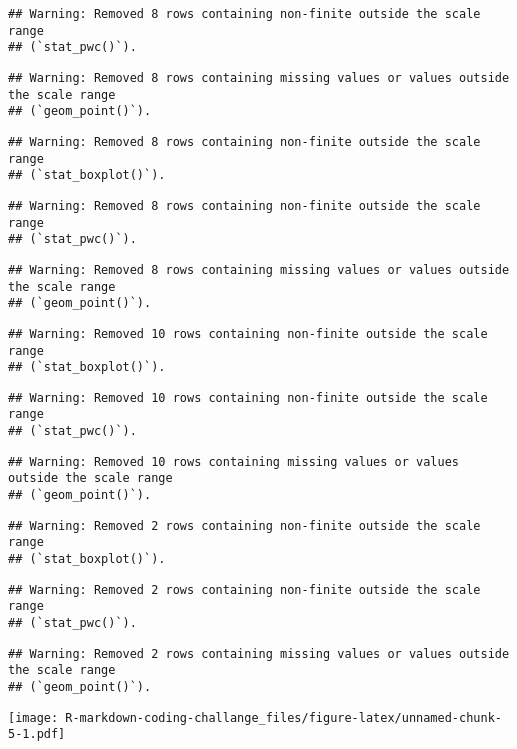 \documentclass[
]{article}
\begin{document}
\begin{verbatim}
## Warning: Removed 8 rows containing non-finite outside the scale range
## (`stat_pwc()`).
\end{verbatim}

\begin{verbatim}
## Warning: Removed 8 rows containing missing values or values outside the scale range
## (`geom_point()`).
\end{verbatim}

\begin{verbatim}
## Warning: Removed 8 rows containing non-finite outside the scale range
## (`stat_boxplot()`).
\end{verbatim}

\begin{verbatim}
## Warning: Removed 8 rows containing non-finite outside the scale range
## (`stat_pwc()`).
\end{verbatim}

\begin{verbatim}
## Warning: Removed 8 rows containing missing values or values outside the scale range
## (`geom_point()`).
\end{verbatim}

\begin{verbatim}
## Warning: Removed 10 rows containing non-finite outside the scale range
## (`stat_boxplot()`).
\end{verbatim}

\begin{verbatim}
## Warning: Removed 10 rows containing non-finite outside the scale range
## (`stat_pwc()`).
\end{verbatim}

\begin{verbatim}
## Warning: Removed 10 rows containing missing values or values outside the scale range
## (`geom_point()`).
\end{verbatim}

\begin{verbatim}
## Warning: Removed 2 rows containing non-finite outside the scale range
## (`stat_boxplot()`).
\end{verbatim}

\begin{verbatim}
## Warning: Removed 2 rows containing non-finite outside the scale range
## (`stat_pwc()`).
\end{verbatim}

\begin{verbatim}
## Warning: Removed 2 rows containing missing values or values outside the scale range
## (`geom_point()`).
\end{verbatim}

\texttt{[image: R-markdown-coding-challange\_files/figure-latex/unnamed-chunk-5-1.pdf]}
\end{document}
